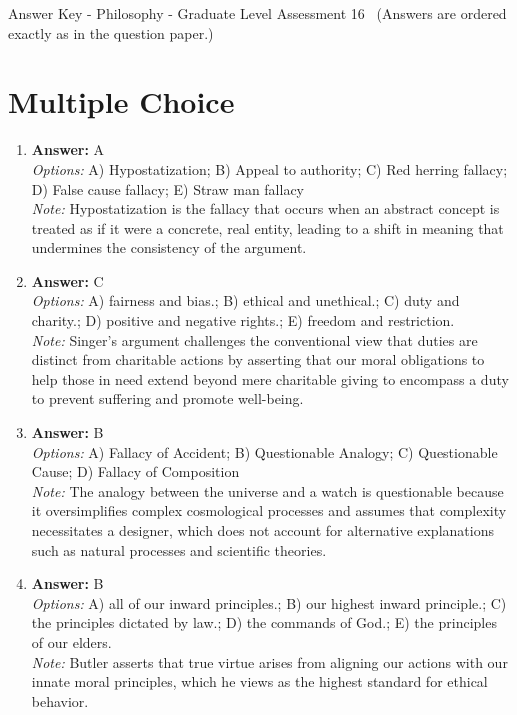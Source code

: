\documentclass[12pt]{article}
\begin{document}
\begin{center}
Answer Key - Philosophy - Graduate Level Assessment 16 \
\small (Answers are ordered exactly as in the question paper.)
\end{center}

\section*{Multiple Choice}
\begin{enumerate}[label=\arabic*.]
\item \textbf{Answer:} A
\\ \textit{Options:} A) Hypostatization; B) Appeal to authority; C) Red herring fallacy; D) False cause fallacy; E) Straw man fallacy
\\ \textit{Note:} Hypostatization is the fallacy that occurs when an abstract concept is treated as if it were a concrete, real entity, leading to a shift in meaning that undermines the consistency of the argument.
\item \textbf{Answer:} C
\\ \textit{Options:} A) fairness and bias.; B) ethical and unethical.; C) duty and charity.; D) positive and negative rights.; E) freedom and restriction.
\\ \textit{Note:} Singer's argument challenges the conventional view that duties are distinct from charitable actions by asserting that our moral obligations to help those in need extend beyond mere charitable giving to encompass a duty to prevent suffering and promote well-being.
\item \textbf{Answer:} B
\\ \textit{Options:} A) Fallacy of Accident; B) Questionable Analogy; C) Questionable Cause; D) Fallacy of Composition
\\ \textit{Note:} The analogy between the universe and a watch is questionable because it oversimplifies complex cosmological processes and assumes that complexity necessitates a designer, which does not account for alternative explanations such as natural processes and scientific theories.
\item \textbf{Answer:} B
\\ \textit{Options:} A) all of our inward principles.; B) our highest inward principle.; C) the principles dictated by law.; D) the commands of God.; E) the principles of our elders.
\\ \textit{Note:} Butler asserts that true virtue arises from aligning our actions with our innate moral principles, which he views as the highest standard for ethical behavior.

\end{enumerate}
\end{document}
